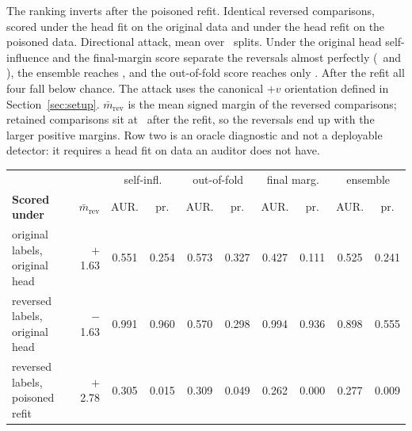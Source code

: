 \caption{The ranking inverts after the poisoned refit. Identical reversed
comparisons, scored under the head fit on the original data and under the head
refit on the poisoned data. Directional attack, mean over \vNSeeds\ splits.
Under the original head self-influence and the final-margin score separate the
reversals almost perfectly (\vStgAurocCleanHeadSelfInf\ and
\vStgAurocCleanHeadTrainDyn), the ensemble reaches \vStgAurocCleanHeadEns, and
the out-of-fold score reaches only \vStgAurocCleanHeadCrossFit. After the refit
all four fall below chance. The attack uses the canonical
$+v$ orientation defined in Section~\ref{sec:setup}.
$\bar m_{\mathrm{rev}}$ is the mean signed margin of the reversed comparisons;
retained comparisons sit at \vMargCleanRefit\ after the refit, so the reversals
end up with the larger positive margins. Row two is an oracle diagnostic and not
a deployable detector: it requires a head fit on data an auditor does not have.}
\label{tab:stages}
\centering
\footnotesize
\begin{tabular}{@{}l r cc cc cc cc@{}}
\toprule
& & \multicolumn{2}{c}{self-infl.} & \multicolumn{2}{c}{out-of-fold}
& \multicolumn{2}{c}{final marg.} & \multicolumn{2}{c}{ensemble} \\
\cmidrule(lr){3-4}\cmidrule(lr){5-6}\cmidrule(lr){7-8}\cmidrule(lr){9-10}
\textbf{Scored under} & $\bar m_{\mathrm{rev}}$ & AUR. & pr. & AUR. & pr. & AUR. & pr. & AUR. & pr. \\
\midrule
original labels, original head & $+$1.63 & 0.551 & 0.254 & 0.573 & 0.327 & 0.427 & 0.111 & 0.525 & 0.241 \\
reversed labels, original head & $-$1.63 & 0.991 & 0.960 & 0.570 & 0.298 & 0.994 & 0.936 & 0.898 & 0.555 \\
reversed labels, poisoned refit & $+$2.78 & 0.305 & 0.015 & 0.309 & 0.049 & 0.262 & 0.000 & 0.277 & 0.009 \\
\bottomrule
\end{tabular}
